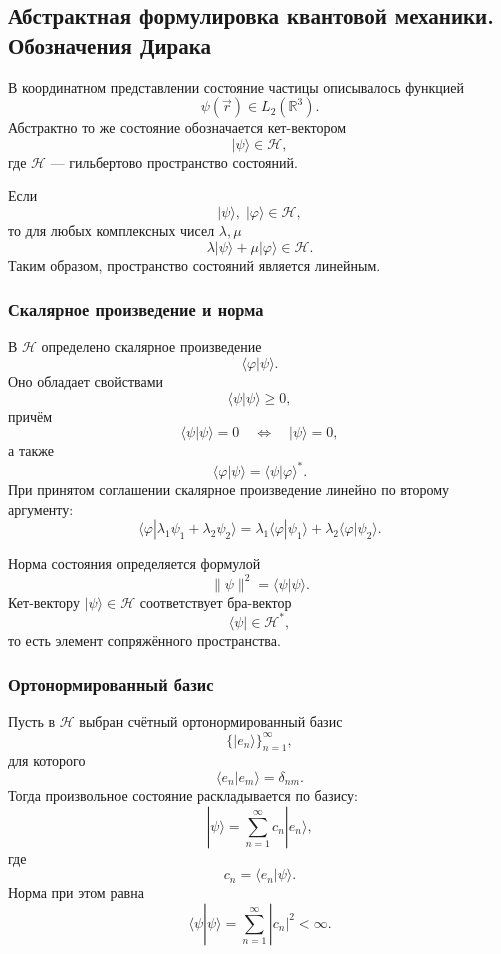 \documentclass[12pt,a4paper]{article}
\begin{document}
\subsection{Абстрактная формулировка квантовой механики. Обозначения Дирака}

В координатном представлении состояние частицы описывалось функцией
\[
    \psi(\vec r)\in L_2(\mathbb R^3).
\]
Абстрактно то же состояние обозначается кет-вектором
\[
    \boxed{
        |\psi\rangle\in\mathcal H
    },
\]
где $\mathcal H$ --- гильбертово пространство состояний.

Если
\[
    |\psi\rangle,\;|\varphi\rangle\in\mathcal H,
\]
то для любых комплексных чисел $\lambda,\mu$
\[
    \boxed{
        \lambda|\psi\rangle+\mu|\varphi\rangle
        \in\mathcal H
    }.
\]
Таким образом, пространство состояний является линейным.

\subsubsection{Скалярное произведение и норма}

В $\mathcal H$ определено скалярное произведение
\[
    \langle\varphi|\psi\rangle.
\]
Оно обладает свойствами
\[
    \langle\psi|\psi\rangle\geq0,
\]
причём
\[
    \langle\psi|\psi\rangle=0
    \quad\Longleftrightarrow\quad
    |\psi\rangle=0,
\]
а также
\[
    \boxed{
        \langle\varphi|\psi\rangle
        =
        \langle\psi|\varphi\rangle^*
    }.
\]
При принятом соглашении скалярное произведение линейно по второму
аргументу:
\[
\boxed{
\langle
\varphi
|
\lambda_1\psi_1+\lambda_2\psi_2
\rangle
=
\lambda_1\langle\varphi|\psi_1\rangle
+
\lambda_2\langle\varphi|\psi_2\rangle
}.
\]

Норма состояния определяется формулой
\[
    \boxed{
        \|\psi\|^2
        =
        \langle\psi|\psi\rangle
    }.
\]
Кет-вектору $|\psi\rangle\in\mathcal H$ соответствует бра-вектор
\[
    \langle\psi|\in\mathcal H^*,
\]
то есть элемент сопряжённого пространства.

\subsubsection{Ортонормированный базис}

Пусть в $\mathcal H$ выбран счётный ортонормированный базис
\[
    \{|e_n\rangle\}_{n=1}^{\infty},
\]
для которого
\[
    \boxed{
        \langle e_n|e_m\rangle
        =
        \delta_{nm}
    }.
\]
Тогда произвольное состояние раскладывается по базису:
\[
    \boxed{
        |\psi\rangle
        =
        \sum_{n=1}^{\infty}
        c_n|e_n\rangle
    },
\]
где
\[
    \boxed{
        c_n=\langle e_n|\psi\rangle
    }.
\]
Норма при этом равна
\[
    \boxed{
        \langle\psi|\psi\rangle
        =
        \sum_{n=1}^{\infty}|c_n|^2
        <\infty
    }.
\]
\end{document}
